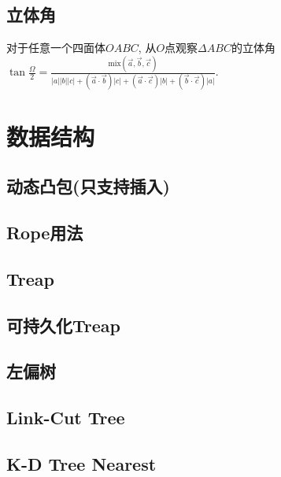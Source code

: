 \documentclass[landscape, twocolumn, 8pt, a4paper, twoside]{extarticle}
\begin{document}
  \subsection{立体角}
    对于任意一个四面体$OABC$,
    从$O$点观察$\Delta ABC$的立体角$\tan{\frac{\Omega}{2}} = 
    \frac{\textrm{mix}(\overrightarrow{a}, \overrightarrow{b}, \overrightarrow{c}) }{
        |a||b||c|
      + (\overrightarrow{a} \cdot \overrightarrow{b}) |c|
      + (\overrightarrow{a} \cdot \overrightarrow{c}) |b|
      + (\overrightarrow{b} \cdot \overrightarrow{c}) |a|
    }$.

\section{数据结构}
  \subsection{动态凸包(只支持插入)}
    
    
  \subsection{Rope用法}
    
  
  \subsection{Treap}
    

  \subsection{可持久化Treap}
    
  
  \subsection{左偏树}
    
  
  \subsection{Link-Cut Tree}
    

  \subsection{K-D Tree Nearest}
    
\end{document}
